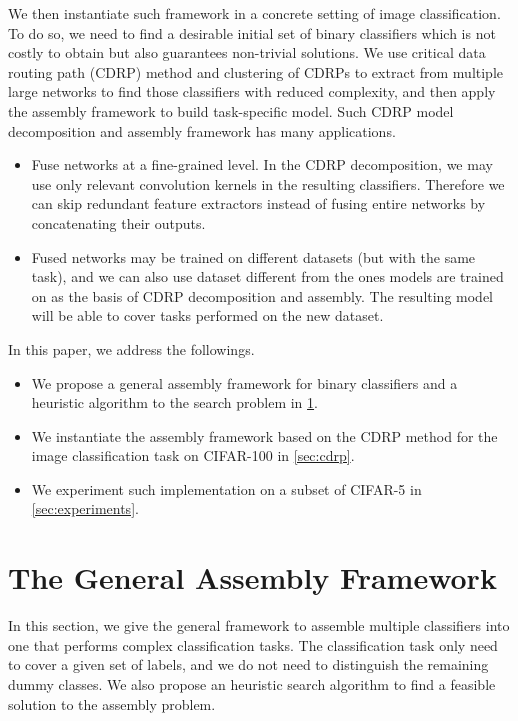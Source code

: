 \documentclass[sigplan,10pt,review]{acmart}\settopmatter{printfolios=true,printccs=false,printacmref=false}
\begin{document}
We then instantiate such framework in a concrete setting of image classification.
To do so, we need to find a desirable initial set of binary classifiers which is not costly to obtain but also guarantees non-trivial solutions.
We use critical data routing path (CDRP) method \cite{wang2018interpret} and clustering of CDRPs to extract from multiple large networks to find those classifiers with reduced complexity, and then apply the assembly framework to build task-specific model.
Such CDRP model decomposition and assembly framework has many applications.
\begin{itemize}
	\item Fuse networks at a fine-grained level.
	In the CDRP decomposition, we may use only relevant convolution kernels in the resulting classifiers.
	Therefore we can skip redundant feature extractors instead of fusing entire networks by concatenating their outputs.
	\item Fused networks may be trained on different datasets (but with the same task), and we can also use dataset different from the ones models are trained on as the basis of CDRP decomposition and assembly.
	The resulting model will be able to cover tasks performed on the new dataset.
\end{itemize}

In this paper, we address the followings.
\begin{itemize}
	\item We propose a general assembly framework for binary classifiers and a heuristic algorithm to the search problem in \cref{sec:assembly}.
	\item We instantiate the assembly framework based on the CDRP method for the image classification task on CIFAR-100 in \cref{sec:cdrp}.
	\item We experiment such implementation on a subset of CIFAR-5 in \cref{sec:experiments}.
\end{itemize}

\section{The General Assembly Framework}
\label{sec:assembly}
In this section, we give the general framework to assemble multiple classifiers into one that performs complex classification tasks.
The classification task only need to cover a given set of labels, and we do not need to distinguish the remaining dummy classes.
We also propose an heuristic search algorithm to find a feasible solution to the assembly problem.
\end{document}
